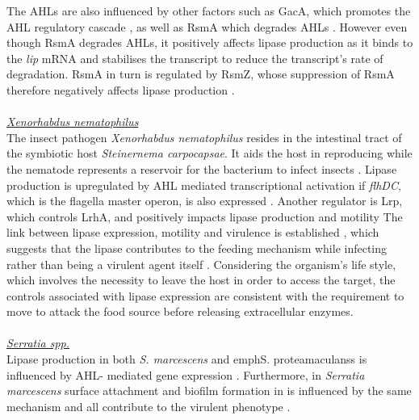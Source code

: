 \documentclass[11pt]{article}
\begin{document}
The AHLs are also influenced by other factors such as GacA, which promotes the AHL regulatory cascade \cite{reimmann1997}, as well as RsmA which degrades AHLs \cite{pessi2001}. However even though RsmA degrades AHLs, it positively affects lipase production as it binds to the \textit{lip} mRNA and stabilises the transcript to reduce the transcript's rate of degradation. RsmA in turn is regulated by RsmZ, whose suppression of RsmA therefore negatively affects lipase production \cite{heurlier2004}. 
\\
\\ \emph{\underline{Xenorhabdus nematophilus}} 
\\The insect pathogen \emph{Xenorhabdus nematophilus} resides in the intestinal tract of the symbiotic host \emph{Steinernema carpocapsae}. It aids the host in reproducing while the nematode represents a reservoir for the bacterium to infect insects \cite{herbert2007}. Lipase production is upregulated by  AHL mediated transcriptional activation \cite{dunphy_97} if \emph{flhDC}, which is the flagella master operon, is also expressed \cite{rosenau2000}. Another regulator is Lrp, which controls LrhA, and positively impacts lipase production and motility \cite{richards2008} 
The link between lipase expression, motility and virulence is established \cite{givaudan_00}, which suggests that the lipase contributes to the feeding mechanism while infecting rather than being a virulent agent itself \cite{richards2010}. Considering the organism's life style, which involves the necessity to leave the host in order to access the target, the controls associated with lipase expression are consistent with the requirement to move to attack the food source before releasing extracellular enzymes.
\\
\\ \emph{\underline{Serratia spp.}} 
\\Lipase production in both \emph{S. marcescens} and emph{S. proteamaculanss} is influenced by AHL- mediated gene expression \cite{horng2002,shibatani2000,christensen_03}. Furthermore, in \emph{Serratia marcescens} surface attachment and biofilm formation in is influenced by the same mechanism \cite{labbate2007} and all contribute to the virulent phenotype \cite{hejazi_97}.

\newpage
\end{document}

